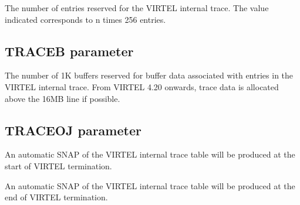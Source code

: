 \documentclass[letterpaper,10pt,english]{sphinxmanual}
\begin{document}
\sphinxAtStartPar
{} \sphinxhyphen{} The number of entries reserved for the VIRTEL internal trace. The value indicated corresponds to n times 256 entries.

\ignorespaces 

\subsection{TRACEB parameter}
\label{\detokenize{Installation_Guide:traceb-parameter}}\label{\detokenize{Installation_Guide:index-129}}
\begin{sphinxVerbatim}[commandchars=\\\{\}]
 
\end{sphinxVerbatim}

\sphinxAtStartPar
{} \sphinxhyphen{} The number of 1K buffers reserved for buffer data associated with entries in the VIRTEL internal trace. From VIRTEL 4.20 onwards, trace data is allocated above the 16MB line if possible.

\ignorespaces 

\subsection{TRACEOJ parameter}
\label{\detokenize{Installation_Guide:traceoj-parameter}}\label{\detokenize{Installation_Guide:index-130}}
\begin{sphinxVerbatim}[commandchars=\\\{\}]
 
\end{sphinxVerbatim}

\sphinxAtStartPar
{} \sphinxhyphen{} An automatic SNAP of the VIRTEL internal trace table will be produced at the start of VIRTEL termination.

\sphinxAtStartPar
{} \sphinxhyphen{} An automatic SNAP of the VIRTEL internal trace table will be produced at the end of VIRTEL termination.
\end{document}
